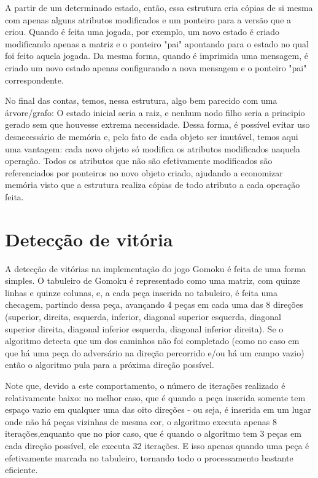 \documentclass{article}
\begin{document}
    A partir de um determinado estado, então, essa estrutura cria cópias de si
    mesma com apenas alguns atributos modificados e um ponteiro para a versão
    que a criou. Quando é feita uma jogada, por exemplo, um novo estado é
    criado modificando apenas a matriz e o ponteiro "pai" apontando para o
    estado no qual foi feito aquela jogada. Da mesma forma, quando é imprimida
    uma mensagem, é criado um novo estado apenas configurando a nova mensagem e
    o ponteiro "pai" correspondente.
    
    No final das contas, temos, nessa estrutura, algo bem parecido com uma
    árvore/grafo: O estado inicial seria a raiz, e nenhum nodo filho seria a
    principio gerado sem que houvesse extrema necessidade. Dessa forma, é
    possível evitar uso desnecessário de memória e, pelo fato de cada objeto
    ser imutável, temos aqui uma vantagem: cada novo objeto só modifica os
    atributos modificados naquela operação. Todos os atributos que não são
    efetivamente modificados são referenciados por ponteiros no novo objeto
    criado, ajudando a economizar memória visto que a estrutura realiza cópias
    de todo atributo a cada operação feita.

\newpage
\section*{Detecção de vitória}
    A detecção de vitórias na implementação do jogo Gomoku é feita de uma forma
    simples. O tabuleiro de Gomoku é representado como uma matriz, com quinze
    linhas e quinze colunas, e, a cada peça inserida no tabuleiro, é feita uma
    checagem, partindo dessa peça, avançando 4 peças em cada uma das 8 direções
    (superior, direita, esquerda, inferior, diagonal superior esquerda,
    diagonal superior direita, diagonal inferior esquerda, diagonal inferior
    direita). Se o algoritmo detecta que um dos caminhos não foi completado
    (como no caso em que há uma peça do adversário na direção percorrido e/ou
    há um campo vazio) então o algoritmo pula para a próxima direção possível.
    
    Note que, devido a este comportamento, o número de iterações realizado é
    relativamente baixo: no melhor caso, que é quando a peça inserida somente
    tem espaço vazio em qualquer uma das oito direções - ou seja, é inserida em
    um lugar onde não há peças vizinhas de mesma cor, o algoritmo executa
    apenas 8 iterações,enquanto que no pior caso, que é quando o algoritmo tem
    3 peças em cada direção possível, ele executa 32 iterações. E isso apenas
    quando uma peça é efetivamente marcada no tabuleiro, tornando todo o
    processamento bastante eficiente.
    
\end{document}
